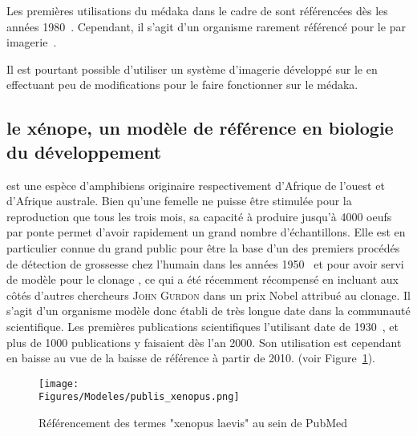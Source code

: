 \documentclass[\main/main.tex]{subfiles}
\begin{document}
Les premières utilisations du médaka dans le cadre de \hcs{} sont référencées dès les années 1980~\cite{cameron_1985,Hatanaka_1982}.
%
Cependant, il s'agit d'un organisme rarement référencé pour le \hcs{} par imagerie~\cite{gierten_2020,genest_2019}.

%
Il est pourtant possible d'utiliser un système d'imagerie développé sur le \pz{}
en effectuant peu de modifications pour le faire fonctionner sur le médaka.

    \subsection{le xénope, un modèle de référence en biologie du développement}

%
\xl{} est une espèce d'amphibiens originaire respectivement d'Afrique de l'ouest et d'Afrique australe.
%
Bien qu'une femelle ne puisse être stimulée pour la reproduction que tous les trois mois,
sa capacité à produire jusqu'à 4000 oeufs par ponte permet d'avoir rapidement un grand nombre d'échantillons.
%
Elle est en particulier connue du grand public pour être la base d'un des premiers procédés de détection de grossesse chez l'humain dans les années 1950~\cite{hobson_1958,Dittebrandt_1949,polack_1949}
et pour avoir servi de modèle pour le clonage , ce qui a été récemment récompensé en incluant aux côtés d'autres chercheurs \textsc{John Gurdon}  dans un prix Nobel attribué au clonage.
%
Il s'agit d'un organisme modèle donc établi de très longue date dans la communauté scientifique.
%
Les premières publications scientifiques l'utilisant date de 1930~\cite{edgeworth_1930},
et plus de 1000 publications y faisaient dès l'an 2000.
%
Son utilisation est cependant en baisse au vue de la baisse de référence à partir de 2010. (voir Figure~\ref{fig:model:xl:stats}).
%

\begin{figure}[htbp]{\textwidth} 
    \centering
       \centering \texttt{[image: \\Figures/Modeles/publis\_xenopus.png]}
       \caption{
            \label{fig:model:xl:stats}Référencement des termes "xenopus laevis" au sein de PubMed
            }
\end{figure}
\end{document}
